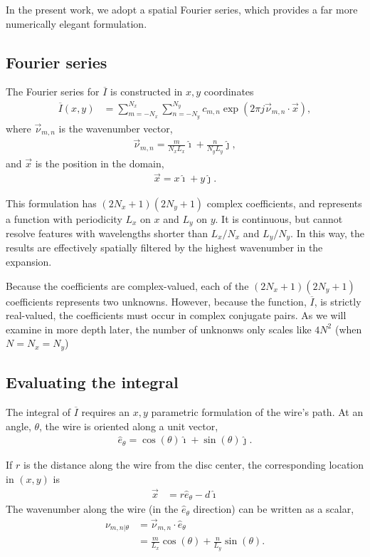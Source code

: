 \documentclass{article}
\def\I{\overline{I}}
\def\x{\vec{x}}
\def\vnu{\vec{\nu}_{m,n}}
\def\nuth{\nu_{m,n|\theta}}
\def\ui{\hat{\imath}}
\def\uj{\hat{\jmath}}
\begin{document}
In the present work, we adopt a spatial Fourier series, which provides a far more numerically elegant formulation.

\subsection{Fourier series}

The Fourier series for $\I$ is constructed in $x,y$ coordinates
\begin{align}
\I(x,y) &= \sum_{m=-N_x}^{N_x} \sum_{n=-N_y}^{N_y} c_{m,n} \exp\left(2\pi j \vnu \cdot \x \right),
\end{align}
where $\vnu$ is the wavenumber vector,
\begin{align}
\vnu = \frac{m}{N_x L_x} \ui + \frac{n}{N_y L_y} \uj,
\end{align}
and $\x$ is the position in the domain,
\begin{align}
\x = x \ui + y \uj.
\end{align}

This formulation has $(2N_x+1)(2N_y+1)$ complex coefficients, and represents a function with periodicity $L_x$ on $x$ and $L_y$ on $y$.  It is continuous, but cannot resolve features with wavelengths shorter than $L_x / N_x$ and $L_y / N_y$.  In this way, the results are effectively spatially filtered by the highest wavenumber in the expansion.

Because the coefficients are complex-valued, each of the $(2N_x+1)(2N_y+1)$ coefficients represents two unknowns.  However, because the function, $\I$, is strictly real-valued, the coefficients must occur in complex conjugate pairs.  As we will examine in more depth later, the number of unknonws only scales like $4N^2$ (when $N = N_x = N_y$)

\subsection{Evaluating the integral}

The integral of $\I$ requires an $x,y$ parametric formulation of the wire's path.  At an angle, $\theta$, the wire is oriented along a unit vector,
\begin{align}
\hat{e}_\theta = \cos(\theta) \ui + \sin(\theta) \uj.
\end{align}


If $r$ is the distance along the wire from the disc center, the corresponding location in $(x,y)$ is
\begin{align}
\x &= r \hat{e}_\theta - d \ui
\end{align}
The wavenumber along the wire (in the $\hat{e}_\theta$ direction) can be written as a scalar,
\begin{align}
\nuth &= \vnu \cdot \hat{e}_\theta\nonumber\\
 &= \frac{m}{L_x} \cos(\theta) + \frac{n}{L_y} \sin(\theta).
\end{align}
\end{document}
